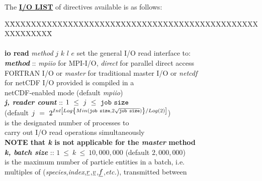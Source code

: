 The \uline{{\bf I/O LIST}} of directives available is as follows:

\begin{tabbing}
X\=XXXXXXXXXXXXXXXXXXXX\=XXXXXXXXXXXXXXXXXXXXXXXXXXXXXXXXXXXX\=\kill
\>                     \> \phantom{xxxxxxxxxxxxxxxxx}  \\
\>                                              \> \\
\> {\bf io read} {\em method}  $j$ $k$ $l$ $e$  \> set the general I/O read interface to: \\
\>                                              \> {\bf \em method} :: {\em mpiio} for MPI-I/O, {\em direct} for parallel direct access \\
\>                                              \> \phantom{x} FORTRAN I/O or {\em master} for traditional master I/O or {\em netcdf} \\
\>                                              \> \phantom{x} for netCDF I/O provided \D is compiled in a \\
\>                                              \> \phantom{x} netCDF-enabled mode (default {\em mpiio}) \\
\>                                              \> \phantom{xxx} {\bf \em j, reader count} :: $1~\le~j~\le~{\tt job~size}$ \\
\>                                              \> \phantom{xxxx} (default $j~=~2^{Int\left[Log\left\{Min({\tt job~size},2\sqrt{\tt job~size})\right\}/Log(2)\right]}$) \\
\>                                              \> \phantom{xxxx} is the designated number of processes to \\
\>                                              \> \phantom{xxxx} carry out I/O read operations simultaneously \\
\>                                              \> {\bf NOTE that {\em k} is not applicable for the {\em master} method} \\
\>                                              \> \phantom{xxx} {\bf \em k, batch size} :: $1~\le~k~\le~10,000,000$ (default $2,000,000$) \\
\>                                              \> \phantom{xxxx} is the maximum number of particle entities in a batch, i.e. \\
\>                                              \> \phantom{xxxx} multiples of ({\em species},{\em index},$\mbox{$\underline{r}$}$,$\mbox{$\underline{v}$}$,$\mbox{$\underline{f}$}$,{\em etc.}), transmitted between \\

\end{tabbing}
